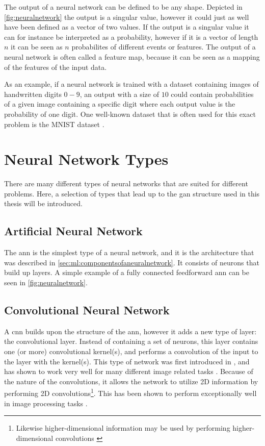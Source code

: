 The output of a neural network can be defined to be any shape. Depicted in \cref{fig:neuralnetwork} the output is a singular value, however it could just as well have been defined as a vector of two values. If the output is a singular value it can for instance be interpreted as a probability, however if it is a vector of length $n$ it can be seen as $n$ probabilites of different events or features. The output of a neural network is often called a feature map, because it can be seen as a mapping of the features of the input data. 

As an example, if a neural network is trained with a dataset containing images of handwritten digits $0-9$, an output with a size of $10$ could contain probabilities of a given image containing a specific digit where each output value is the probability of one digit. One well-known dataset that is often used for this exact problem is the MNIST dataset \cite{mnist}.


\section{Neural Network Types}
There are many different types of neural networks that are suited for different problems. Here, a selection of types that lead up to the \acrfull{gan} structure used in this thesis will be introduced. 

\subsection{Artificial Neural Network}
The \acrfull{ann} is the simplest type of a neural network, and it is the architecture that was described in \cref{sec:ml:componentsofaneuralnetwork}. It consists of neurons that build up layers. A simple example of a fully connected feedforward \acrshort{ann} can be seen in \cref{fig:neuralnetwork}. 


\subsection{Convolutional Neural Network}
A \acrfull{cnn} builds upon the structure of the \acrshort{ann}, however it adds a new type of layer: the convolutional layer. Instead of containing a set of neurons, this layer contains one (or more) convolutional kernel(s), and performs a convolution of the input to the layer with the kernel(s). This type of network was first introduced in \citeyear{lecun1999object}, and has shown to work very well for many different image related tasks \cite{lecun1999object,alexnet}. Because of the nature of the convolutions, it allows the network to utilize 2D information by performing 2D convolutions\footnote{Likewise higher-dimensional information may be used by performing higher-dimensional convolutions \cite{8353466}}. This has been shown to perform exceptionally well in image processing tasks \cite{alexnet,oshea2015introduction}. 

